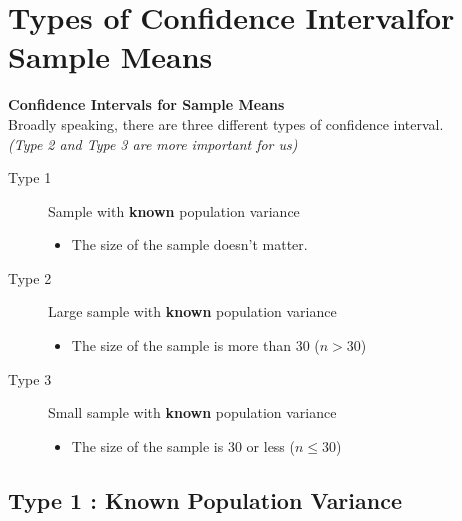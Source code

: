 \documentclass[a4paper,12pt]{article}
\begin{document}
\section*{Types of Confidence Intervalfor Sample Means}
\begin{framed}
\noindent \textbf{Confidence Intervals for Sample Means}\\
Broadly speaking, there are three different types of confidence interval. \\
\textit{(Type 2 and Type 3 are more important for us)}
\begin{description}
\item[Type 1] Sample with \textbf{known} population variance
\begin{itemize}
\item The size of the sample doesn't matter.
\end{itemize}
\item[Type 2] Large sample with \textbf{known} population variance
\begin{itemize}
\item The size of the sample is more than 30 ($n > 30$)
\end{itemize}
\item[Type 3] Small sample with \textbf{known} population variance
\begin{itemize}
\item The size of the sample is 30 or less ($n\leq 30$)
\end{itemize}
\end{description}
\end{framed}



\subsection*{Type 1 : Known Population Variance}
\end{document}
